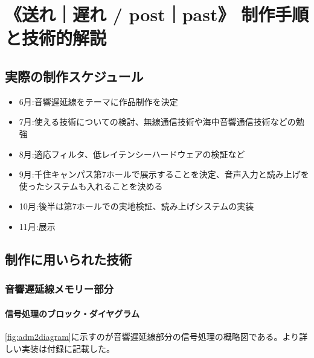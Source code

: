 \documentclass[a4paper,report]{jsbook}
\begin{document}
\chapter{《送れ｜遅れ / post｜past》
制作手順と技術的解説}\label{ux9001ux308cux9045ux308c-postpast-ux5236ux4f5cux624bux9806ux3068ux6280ux8853ux7684ux89e3ux8aac}

\section{実際の制作スケジュール}\label{ux5b9fux969bux306eux5236ux4f5cux30b9ux30b1ux30b8ux30e5ux30fcux30eb}

\begin{itemize}
\tightlist
\item
  6月:音響遅延線をテーマに作品制作を決定
\item
  7月:使える技術についての検討、無線通信技術や海中音響通信技術などの勉強
\item
  8月:適応フィルタ、低レイテンシーハードウェアの検証など
\item
  9月:千住キャンパス第7ホールで展示することを決定、音声入力と読み上げを使ったシステムも入れることを決める
\item
  10月:後半は第7ホールでの実地検証、読み上げシステムの実装
\item
  11月:展示
\end{itemize}

\section{制作に用いられた技術}\label{ux5236ux4f5cux306bux7528ux3044ux3089ux308cux305fux6280ux8853}

\subsection{音響遅延線メモリー部分}\label{ux97f3ux97ffux9045ux5ef6ux7ddaux30e1ux30e2ux30eaux30fcux90e8ux5206}

\subsubsection{信号処理のブロック・ダイヤグラム}\label{ux4fe1ux53f7ux51e6ux7406ux306eux30d6ux30edux30c3ux30afux30c0ux30a4ux30e4ux30b0ux30e9ux30e0}

\cref{fig:adm2diagram}に示すのが音響遅延線部分の信号処理の概略図である。より詳しい実装は付録に記載した。
\end{document}
